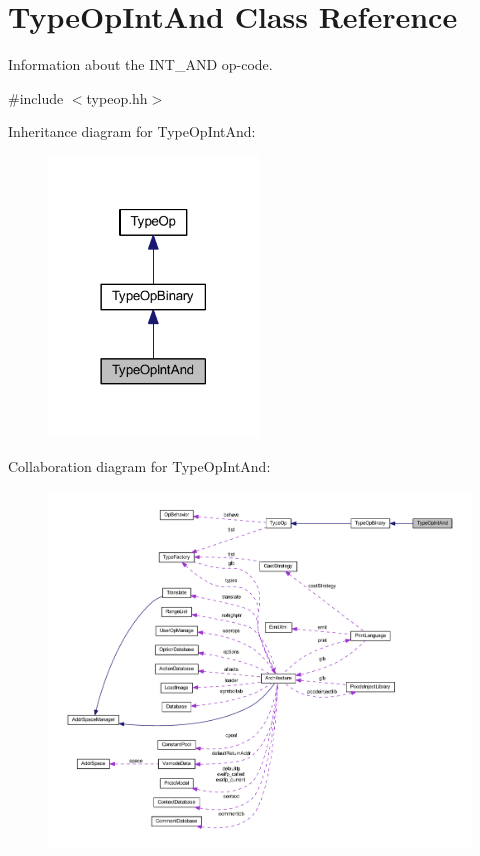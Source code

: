 \hypertarget{class_type_op_int_and}{}\section{Type\+Op\+Int\+And Class Reference}
\label{class_type_op_int_and}


Information about the I\+N\+T\+\_\+\+A\+ND op-\/code.  




{\ttfamily \#include $<$typeop.\+hh$>$}



Inheritance diagram for Type\+Op\+Int\+And\+:
\nopagebreak
\begin{figure}[H]
\begin{center}
\leavevmode
\includegraphics[width=158pt]{class_type_op_int_and__inherit__graph}
\end{center}
\end{figure}


Collaboration diagram for Type\+Op\+Int\+And\+:
\nopagebreak
\begin{figure}[H]
\begin{center}
\leavevmode
\includegraphics[width=350pt]{class_type_op_int_and__coll__graph}
\end{center}
\end{figure}
